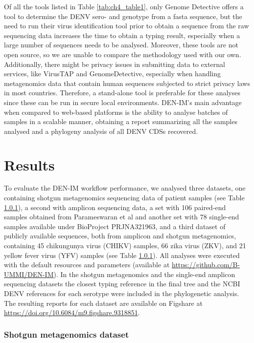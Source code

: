 Of all the tools listed in Table \ref{tab:ch4_table1}, only Genome Detective offers a tool to determine the DENV sero- and genotype from a fasta sequence, but the need to run their virus identification tool prior to obtain a sequence from the raw sequencing data increases the time to obtain a typing result, especially when a large number of sequences needs to be analysed. Moreover, these tools are not open source, so we are unable to compare the methodology used with our own. Additionally, there might be privacy issues in submitting data to external services, like VirusTAP and GenomeDetective, especially when handling metagenomics data that contain human sequences subjected to strict privacy laws in most countries. Therefore, a stand-alone tool is preferable for these analyses since these can be run in secure local environments. DEN-IM’s main advantage when compared to web-based platforms is the ability to analyse batches of samples in a scalable manner, obtaining a report summarizing all the samples analysed and a phylogeny analysis of all DENV CDSs recovered.


\section{Results}

To evaluate the DEN-IM workflow performance, we analysed three datasets, one containing shotgun metagenomics sequencing data of patient samples (see Table \ref{}), a second with amplicon sequencing data, a set with 106 paired-end samples obtained from Parameswaran et al \citep{parameswaran_intrahost_2017} and another set with 78 single-end samples available under BioProject PRJNA321963, and a third dataset of publicly available sequences, both from amplicon and shotgun metagenomics, containing 45 chikungunya virus (CHIKV) samples, 66 zika virus (ZKV), and 21 yellow fever virus (YFV) samples (see Table \ref{}). All analyses were executed with the default resources and parameters (available at \url{https://github.com/B-UMMI/DEN-IM}). In the shotgun metagenomics and the single-end amplicon sequencing datasets the closest typing reference in the final tree and the NCBI DENV references for each serotype were included in the phylogenetic analysis. The resulting reports for each dataset are available on Figshare at \url{https://doi.org/10.6084/m9.figshare.9318851}.

\subsubsection{Shotgun metagenomics dataset}

